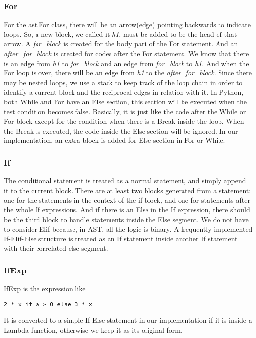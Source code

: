 \documentclass[11pt]{article}
\begin{document}
\subsubsection{For}
For the ast.For class, there will be an arrow(edge) pointing backwards to indicate loops. So, a new block, we called it \textit{h1}, must be added to be the head of that arrow. A \textit{for\_block} is created for the body part of the For statement. And an \textit{after\_for\_block} is created for codes after the For statement. We know that there is an edge from \textit{h1} to \textit{for\_block} and an edge from \textit{for\_block} to \textit{h1}. And when the For loop is over, there will be an edge from \textit{h1} to the \textit{after\_for\_block}. Since there may be nested loops, we use a stack to keep track of the loop chain in order to identify a current block and the reciprocal edges in relation with it. In Python, both While and For have an Else section, this section will be executed when the test condition becomes false. Basically, it is just like the code after the While or For block except for the condition when there is a Break inside the loop. When the Break is executed, the code inside the Else section will be ignored. In our implementation, an extra block is added for Else section in For or While.

\subsubsection{If}
The conditional statement is treated as a normal statement, and simply append it to the current block. There are at least two blocks generated from a statement: one for the statements in the context of the if block, and one for statements after the whole If expressions. And if there is an Else in the If expression, there should be the third block to handle statements inside the Else segment. We do not have to consider Elif because, in AST, all the logic is binary. A frequently implemented If-Elif-Else structure is treated as an If statement inside another If statement with their correlated else segment.

\subsubsection{IfExp}
IfExp is the expression like
\begin{lstlisting}
2 * x if a > 0 else 3 * x
\end{lstlisting}
It is converted to a simple If-Else statement in our implementation if it is inside a Lambda function, otherwise we keep it as its original form.
\end{document}
